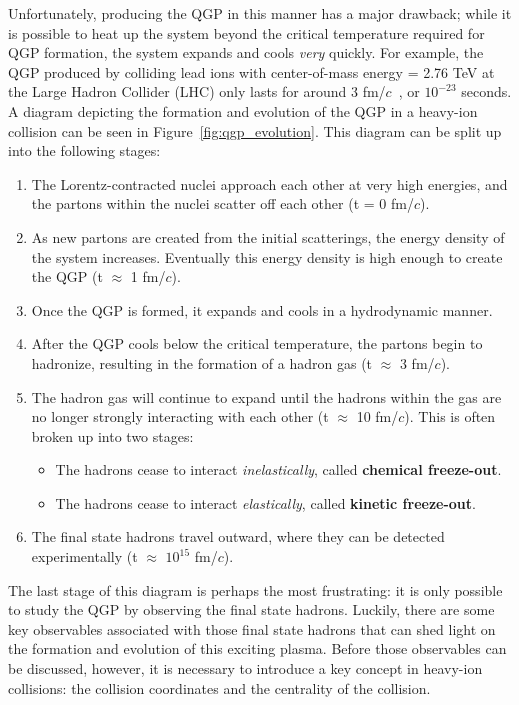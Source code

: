 Unfortunately, producing the QGP in this manner has a major drawback; while it is possible to heat up the system beyond the critical temperature required for QGP formation, the system expands and cools \textit{very} quickly. For example, the QGP produced by colliding lead ions with center-of-mass energy \snn = 2.76 TeV at the Large Hadron Collider (LHC) only lasts for around 3 fm/$c$~\cite{QGPFormation}, or $10^{-23}$ seconds. A diagram depicting the formation and evolution of the QGP in a heavy-ion collision can be seen in Figure~\ref{fig:qgp_evolution}. This diagram can be split up into the following stages:
%
\begin{enumerate}
    \item The Lorentz-contracted nuclei approach each other at very high energies, and the partons within the nuclei scatter off each other (t = 0 fm/$c$).
    \item As new partons are created from the initial scatterings, the energy density of the system increases. Eventually this energy density is high enough to create the QGP (t $\approx$ 1 fm/$c$).
    \item Once the QGP is formed, it expands and cools in a hydrodynamic manner. 
    \item After the QGP cools below the critical temperature, the partons begin to hadronize, resulting in the formation of a hadron gas (t $\approx$ 3 fm/$c$).
    \item The hadron gas will continue to expand until the hadrons within the gas are no longer strongly interacting with each other (t $\approx$ 10 fm/$c$). This is often broken up into two stages:
        \begin{itemize}
            \item The hadrons cease to interact \textit{inelastically}, called \textbf{chemical freeze-out}. 
            \item The hadrons cease to interact \textit{elastically}, called \textbf{kinetic freeze-out}.
        \end{itemize} 
    \item The final state hadrons travel outward, where they can be detected experimentally (t $\approx$ $10^{15}$ fm/$c$).
\end{enumerate} 
%
The last stage of this diagram is perhaps the most frustrating: it is only possible to study the QGP by observing the final state hadrons. Luckily, there are some key observables associated with those final state hadrons that can shed light on the formation and evolution of this exciting plasma. Before those observables can be discussed, however, it is necessary to introduce a key concept in heavy-ion collisions: the collision coordinates and the centrality of the collision.

